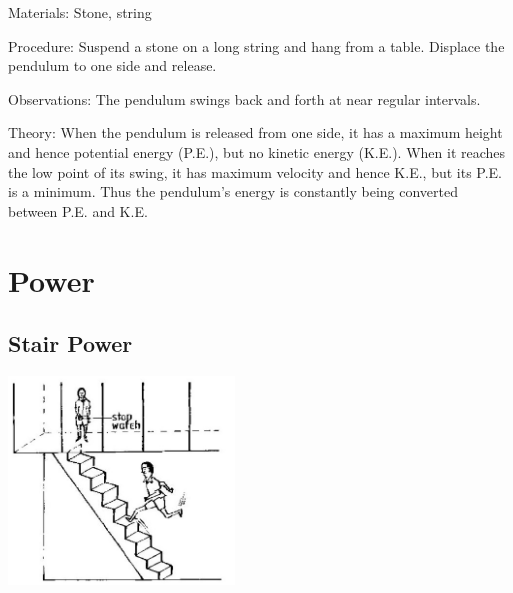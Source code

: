 \begin{multicols}{2}
\begin{description*}
\item[Materials:]{Stone, string}
\item[Procedure:]{Suspend a stone on a long string and hang from a table. Displace the pendulum to one side and release.}
\item[Observations:]{The pendulum swings back and forth at near regular intervals.}
\item[Theory:]{When the pendulum is released from one side, it has a maximum height and hence potential energy (P.E.), but no kinetic energy (K.E.). When it reaches the low point of its swing, it has maximum velocity and hence K.E., but its P.E. is a minimum. Thus the pendulum's energy is constantly being converted between P.E. and K.E.}
\end{description*}


\section*{Power}


\subsection{Stair Power}

\begin{center}
\includegraphics[width=0.45\textwidth]{./img/source/power-2.jpg}
\end{center}


\end{multicols}
